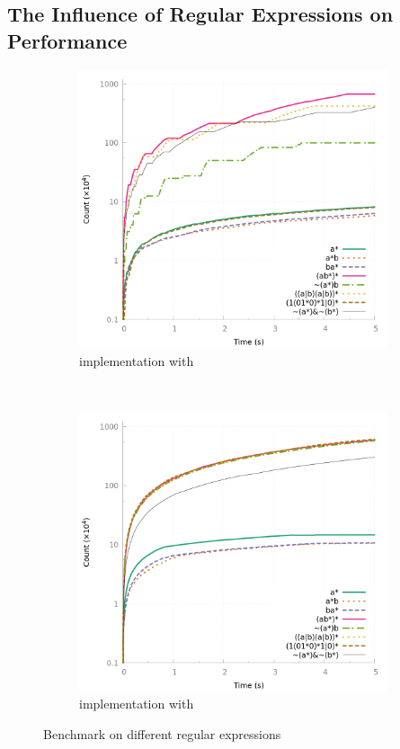 \subsection{The Influence of Regular Expressions on Performance}
\begin{figure}[tp]
  \centering
  \begin{subfigure}[t]{0.5\linewidth}
    \centering
    \includegraphics[width=\linewidth]{measure/haskell_langs.png}
    \caption{\haskell implementation with }
    \label{bench:haskell:langs}
  \end{subfigure}~
  \begin{subfigure}[t]{0.5\linewidth}
    \centering
    \includegraphics[width=\linewidth]{measure/ocaml_langs.png}
    \caption{\ocaml implementation with }
    \label{bench:ocaml:langs}
  \end{subfigure}
  \caption{Benchmark on different regular expressions}
  \label{bench:langs}
\end{figure}

